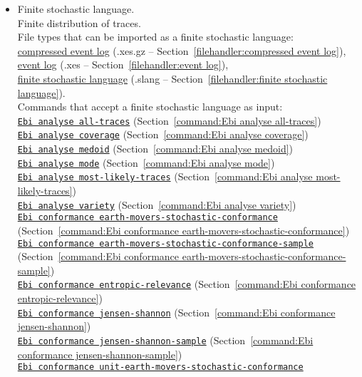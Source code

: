 {\begin{itemize}
\item Finite stochastic language.
\\Finite distribution of traces.
\\File types that can be imported as a finite stochastic language: \\\null\qquad\hyperref[filehandler:compressed event log]{compressed event log} (.xes.gz -- Section~\ref{filehandler:compressed event log}), \\\null\qquad\hyperref[filehandler:event log]{event log} (.xes -- Section~\ref{filehandler:event log}), \\\null\qquad\hyperref[filehandler:finite stochastic language]{finite stochastic language} (.slang -- Section~\ref{filehandler:finite stochastic language}).
\\Commands that accept a finite stochastic language as input: \\\null\qquad\hyperref[command:Ebi analyse all-traces]{\texttt{Ebi analyse all-traces}} (Section~\ref{command:Ebi analyse all-traces})\\\null\qquad\hyperref[command:Ebi analyse coverage]{\texttt{Ebi analyse coverage}} (Section~\ref{command:Ebi analyse coverage})\\\null\qquad\hyperref[command:Ebi analyse medoid]{\texttt{Ebi analyse medoid}} (Section~\ref{command:Ebi analyse medoid})\\\null\qquad\hyperref[command:Ebi analyse mode]{\texttt{Ebi analyse mode}} (Section~\ref{command:Ebi analyse mode})\\\null\qquad\hyperref[command:Ebi analyse most-likely-traces]{\texttt{Ebi analyse most-likely-traces}} (Section~\ref{command:Ebi analyse most-likely-traces})\\\null\qquad\hyperref[command:Ebi analyse variety]{\texttt{Ebi analyse variety}} (Section~\ref{command:Ebi analyse variety})\\\null\qquad\hyperref[command:Ebi conformance earth-movers-stochastic-conformance]{\texttt{Ebi conformance earth-movers-stochastic-conformance}} (Section~\ref{command:Ebi conformance earth-movers-stochastic-conformance})\\\null\qquad\hyperref[command:Ebi conformance earth-movers-stochastic-conformance-sample]{\texttt{Ebi conformance earth-movers-stochastic-conformance-sample}} (Section~\ref{command:Ebi conformance earth-movers-stochastic-conformance-sample})\\\null\qquad\hyperref[command:Ebi conformance entropic-relevance]{\texttt{Ebi conformance entropic-relevance}} (Section~\ref{command:Ebi conformance entropic-relevance})\\\null\qquad\hyperref[command:Ebi conformance jensen-shannon]{\texttt{Ebi conformance jensen-shannon}} (Section~\ref{command:Ebi conformance jensen-shannon})\\\null\qquad\hyperref[command:Ebi conformance jensen-shannon-sample]{\texttt{Ebi conformance jensen-shannon-sample}} (Section~\ref{command:Ebi conformance jensen-shannon-sample})\\\null\qquad\hyperref[command:Ebi conformance unit-earth-movers-stochastic-conformance]{\texttt{Ebi conformance unit-earth-movers-stochastic-conformance}} 
\end{itemize}}
